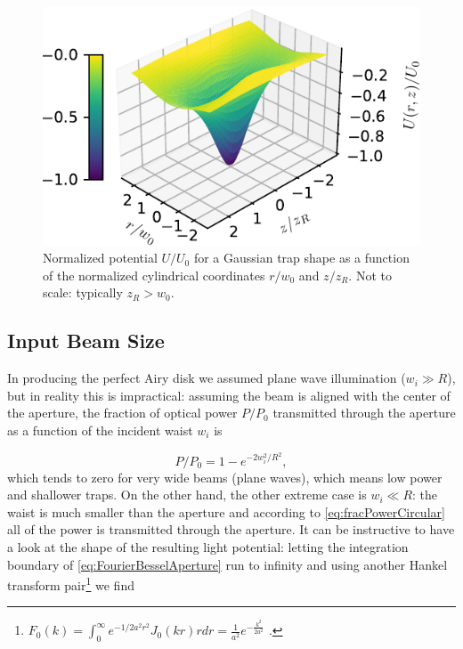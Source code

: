 \begin{figure}
    \centering
    \includegraphics[width=.67\linewidth]{figures/GaussianPotential.pdf}
    \caption{Normalized potential $U/U_0$ for a Gaussian trap shape as a function of the normalized cylindrical coordinates $r/w_0$ and $z/z_R$. Not to scale: typically $z_R > w_0$.}
    \label{fig:GaussianPotential}
\end{figure}

\subsection{Input Beam Size}\label{sec:TweezersPractice}

In producing the perfect Airy disk we assumed plane wave illumination ($w_i \gg R$), but in reality this is impractical: assuming the beam is aligned with the center of the aperture, the fraction of optical power $P/P_0$ transmitted through the aperture as a function of the incident waist $w_i$ is

\begin{equation}\label{eq:fracPowerCircular}
	P/P_0 = 1 - e^{-2w_i^2/R^2},
\end{equation}
which tends to zero for very wide beams (plane waves), which means low power and shallower traps.
On the other hand, the other extreme case is $w_i \ll R$: the waist is much smaller than the aperture and according to \cref{eq:fracPowerCircular} all of the power is transmitted through the aperture.
It can be instructive to have a look at the shape of the resulting light potential: letting the integration boundary of \cref{eq:FourierBesselAperture} run to infinity and using another Hankel transform pair\footnote{$F_0(k) = \int_0^{\infty} e^{-1/2 a^2 r^2} J_0(k r)r dr = \frac{1}{a^2} e^{-\frac{k^2}{2a^2}}$ \cite{Papoulis2981}.} we find 

